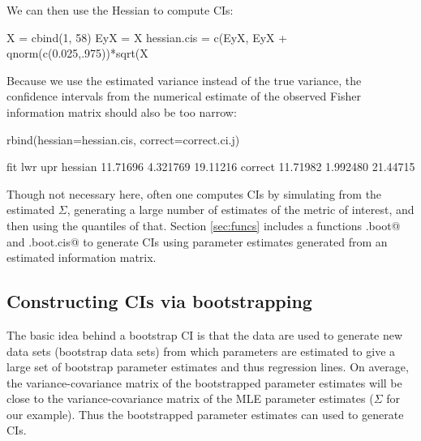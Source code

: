 We can then use the Hessian to compute CIs:
\begin{Schunk}
\begin{Sinput}
 X = cbind(1, 58)
 EyX = X%*%parMean
 hessian.cis = c(EyX, EyX + qnorm(c(0.025,.975))*sqrt(X%*%parSigma%*%t(X)))
\end{Sinput}
\end{Schunk}

Because we use the estimated variance instead of the true variance, the confidence intervals from the numerical estimate of the observed Fisher information matrix should also be too narrow:
\begin{Schunk}
\begin{Sinput}
 rbind(hessian=hessian.cis, correct=correct.ci.j) 
\end{Sinput}
\begin{Soutput}
             fit      lwr      upr
hessian 11.71696 4.321769 19.11216
correct 11.71982 1.992480 21.44715
\end{Soutput}
\end{Schunk}

Though not necessary here, often one computes CIs by simulating from the estimated $\Sigma$, generating a large number of estimates of the metric of interest, and then using the quantiles of that.  Section \ref{sec:funcs} includes a functions \verb@hessian.boot@ and \verb@hessian.boot.cis@ to generate CIs using parameter estimates generated from an estimated information matrix.  

\subsection{Constructing CIs via bootstrapping}\label{subsec:bootstrap}

The basic idea behind a bootstrap CI is that the data are used to generate new data sets (bootstrap data sets) from which parameters are estimated to give a large set of bootstrap parameter estimates and thus regression lines.  On average, the variance-covariance matrix of the bootstrapped parameter estimates will be close to the variance-covariance matrix of the MLE parameter estimates ($\Sigma$ for our example).  Thus the bootstrapped parameter estimates can used to generate CIs.


